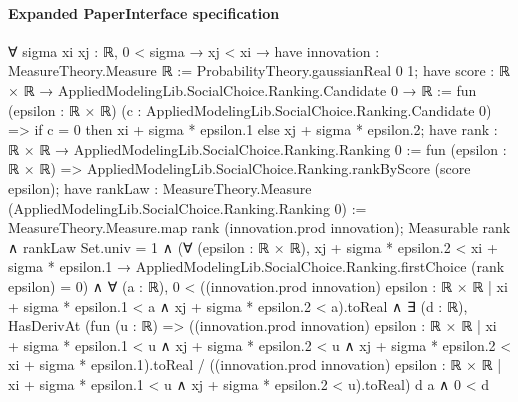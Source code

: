 \documentclass[10pt]{article}
\begin{document}
\paragraph{Expanded PaperInterface specification}
\begin{ReviewVerbatim}
∀ {sigma xi xj : ℝ},
  0 < sigma →
    xj < xi →
      have innovation : MeasureTheory.Measure ℝ := ProbabilityTheory.gaussianReal 0 1;
      have score : ℝ × ℝ → AppliedModelingLib.SocialChoice.Ranking.Candidate 0 → ℝ :=
        fun (epsilon : ℝ × ℝ) (c : AppliedModelingLib.SocialChoice.Ranking.Candidate 0) =>
        if c = 0 then xi + sigma * epsilon.1 else xj + sigma * epsilon.2;
      have rank : ℝ × ℝ → AppliedModelingLib.SocialChoice.Ranking.Ranking 0 := fun (epsilon : ℝ × ℝ) =>
        AppliedModelingLib.SocialChoice.Ranking.rankByScore (score epsilon);
      have rankLaw : MeasureTheory.Measure (AppliedModelingLib.SocialChoice.Ranking.Ranking 0) :=
        MeasureTheory.Measure.map rank (innovation.prod innovation);
      Measurable rank ∧
        rankLaw Set.univ = 1 ∧
          (∀ (epsilon : ℝ × ℝ),
              xj + sigma * epsilon.2 < xi + sigma * epsilon.1 →
                AppliedModelingLib.SocialChoice.Ranking.firstChoice (rank epsilon) = 0) ∧
            ∀ (a : ℝ),
              0 <
                  ((innovation.prod innovation)
                      {epsilon : ℝ × ℝ | xi + sigma * epsilon.1 < a ∧ xj + sigma * epsilon.2 < a}).toReal ∧
                ∃ (d : ℝ),
                  HasDerivAt
                      (fun (u : ℝ) =>
                        ((innovation.prod innovation)
                              {epsilon : ℝ × ℝ |
                                xi + sigma * epsilon.1 < u ∧
                                  xj + sigma * epsilon.2 < u ∧
                                    xj + sigma * epsilon.2 < xi + sigma * epsilon.1}).toReal /
                          ((innovation.prod innovation)
                              {epsilon : ℝ × ℝ | xi + sigma * epsilon.1 < u ∧ xj + sigma * epsilon.2 < u}).toReal)
                      d a ∧
                    0 < d
\end{ReviewVerbatim}
\end{document}

